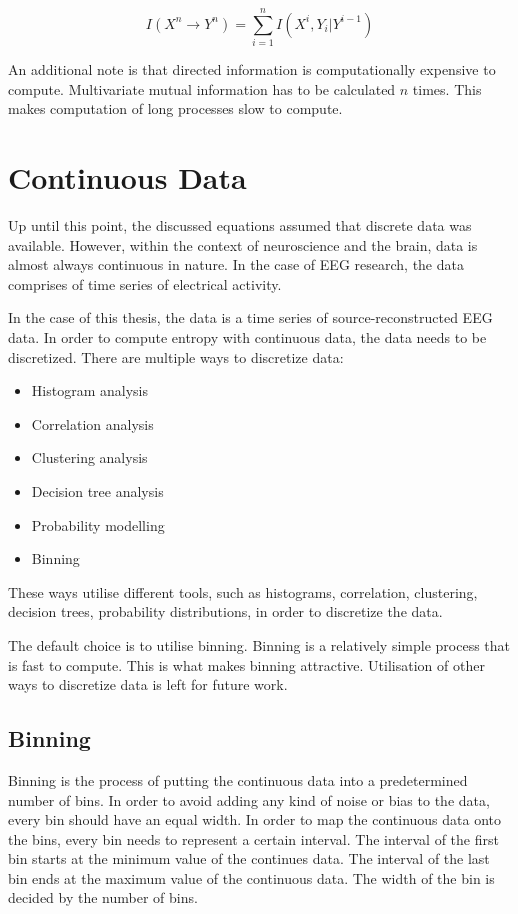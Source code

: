 \begin{equation}
I(X^n \rightarrow Y^n) = \sum^{n}_{i=1}I(X^i, Y_i | Y^{i-1})
\end{equation}

An additional note is that directed information is computationally expensive to compute. Multivariate mutual information has to be calculated $n$ times. This makes computation of long processes slow to compute. 

\section{Continuous Data}\label{binning}
Up until this point, the discussed equations assumed that discrete data was available. However, within the context of neuroscience and the brain, data is almost always continuous in nature. In the case of EEG research, the data comprises of time series of electrical activity.

In the case of this thesis, the data is a time series of source-reconstructed EEG data. In order to compute entropy with continuous data, the data needs to be discretized. There are multiple ways to discretize data:

\begin{itemize}
\item Histogram analysis
\item Correlation analysis
\item Clustering analysis
\item Decision tree analysis
\item Probability modelling
\item Binning
\end{itemize}

These ways utilise different tools, such as histograms, correlation, clustering, decision trees, probability distributions, in order to discretize the data. 

The default choice is to utilise binning. Binning is a relatively simple process that is fast to compute. This is what makes binning attractive. Utilisation of other ways to discretize data is left for future work.

\subsection{Binning}

Binning is the process of putting the continuous data into a predetermined number of bins. In order to avoid adding any kind of noise or bias to the data, every bin should have an equal width. In order to map the continuous data onto the bins, every bin needs to represent a certain interval. The interval of the first bin starts at the minimum value of the continues data. The interval of the last bin ends at the maximum value of the continuous data. The width of the bin is decided by the number of bins. 

